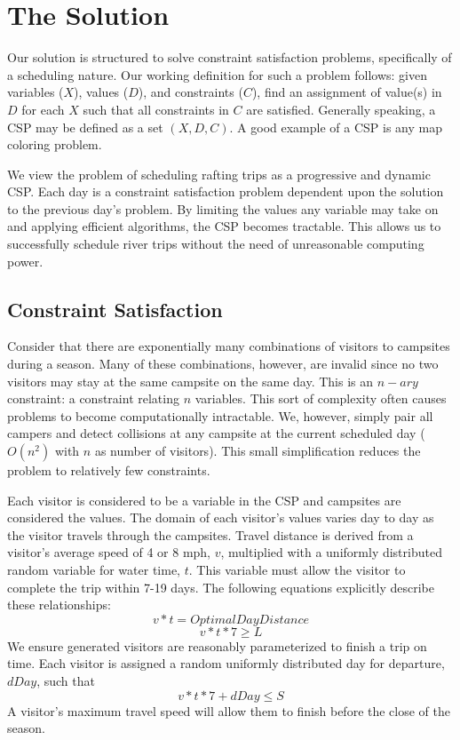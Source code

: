 \documentclass[11pt]{article} %
\begin{document}
\section{The Solution}
\label{sec:model-details}
Our solution is structured to solve constraint satisfaction problems,
specifically of a scheduling nature.  Our working definition for such a
problem follows: given variables ($X$), values ($D$),
and constraints ($C$), find an assignment of value(s) in $D$
for each $X$ such that all constraints in $C$ are satisfied.  Generally
speaking, a CSP may be defined as a set $(X,D,C)$.
A good example of a CSP is any map coloring problem\cite{DynamicCSP}.

We view the problem of scheduling rafting trips as a progressive and dynamic
CSP. Each day is a constraint satisfaction problem dependent upon the
solution to the previous day's problem.  By limiting the values any variable
may take on and applying efficient algorithms, the CSP becomes tractable.
This allows us to successfully schedule river trips without the need of 
unreasonable computing power.

\subsection{Constraint Satisfaction}
\label{sec:csp}

Consider that there are exponentially
many combinations of  visitors to campsites during a season.  Many of
these combinations, however, are invalid since no two
 visitors may stay at the same campsite on the same day.
This is an $n-ary$ constraint: a constraint relating $n$ variables.  This sort 
of complexity often causes problems to become computationally intractable.  We, 
however, simply pair all campers and detect collisions at any campsite at the 
current scheduled day
($O(n^2)$ with $n$ as number of  visitors).  This small simplification reduces 
the problem to relatively few constraints.

Each visitor is considered to be a variable
in the CSP and campsites are considered the values.  The domain of
each visitor's values varies day to day as the visitor travels through the
campsites.  Travel distance is derived from
a visitor's average speed of 4 or 8 mph, $v$,  multiplied with a uniformly distributed
random variable for water time, $t$.  This variable must allow the visitor to complete the trip
within 7-19 days. The following equations explicitly
describe these relationships:
$$v*t=OptimalDayDistance$$
$$v*t*7\geq L$$
We ensure generated visitors are reasonably
parameterized to finish a trip on time.  Each visitor is assigned a random
uniformly distributed day for departure, $dDay$, such that
$$v*t*7+dDay\leq S$$
A visitor's maximum travel speed will allow them to finish before
the close of the season.
\end{document}
